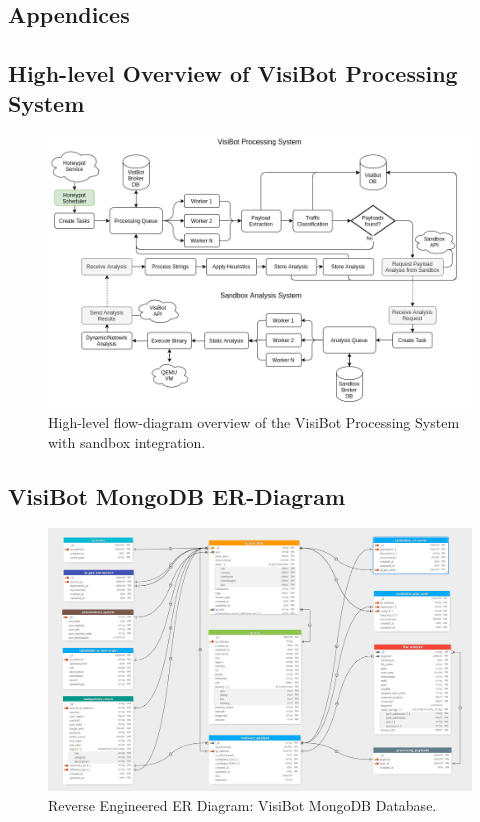 \begin{appendices}
\chapter{Appendices}

\section{High-level Overview of VisiBot Processing System}
\label{appendix_a0}
\begin{figure}[!htb]
    \centering
    \includegraphics[width=1.0\linewidth]{flowcharts/high_level_overview.png}
    \caption{High-level flow-diagram overview of the VisiBot Processing System with sandbox integration.}
    \label{fig:high_level_overview} 
\end{figure}

\newpage

\section{VisiBot MongoDB ER-Diagram}
\label{appendix_a1}
\begin{figure}[!htb]
 \centering
 \includegraphics[width=1.0\linewidth]{graphs/mongodb_er_diagram.png}
 \caption{Reverse Engineered ER Diagram: VisiBot MongoDB Database.}
\end{figure}


\end{appendices}
